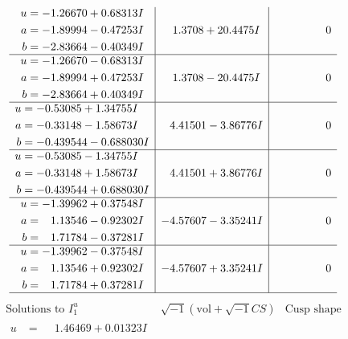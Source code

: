 \documentclass[1p]{elsarticle_modified}
\theoremstyle{definition}
\newcommand{\I}{\sqrt{-1}}
\begin{document}
$$\begin{array}{c|c|c}
\begin{aligned}
u &= -1.26670 + 0.68313 I \\
a &= -1.89994 - 0.47253 I \\
b &= -2.83664 - 0.40349 I\end{aligned}
 & \phantom{-}1.3708 + 20.4475 I & \phantom{-0.000000 } 0 \\ \hline\begin{aligned}
u &= -1.26670 - 0.68313 I \\
a &= -1.89994 + 0.47253 I \\
b &= -2.83664 + 0.40349 I\end{aligned}
 & \phantom{-}1.3708 - 20.4475 I & \phantom{-0.000000 } 0 \\ \hline\begin{aligned}
u &= -0.53085 + 1.34755 I \\
a &= -0.33148 - 1.58673 I \\
b &= -0.439544 - 0.688030 I\end{aligned}
 & \phantom{-}4.41501 - 3.86776 I & \phantom{-0.000000 } 0 \\ \hline\begin{aligned}
u &= -0.53085 - 1.34755 I \\
a &= -0.33148 + 1.58673 I \\
b &= -0.439544 + 0.688030 I\end{aligned}
 & \phantom{-}4.41501 + 3.86776 I & \phantom{-0.000000 } 0 \\ \hline\begin{aligned}
u &= -1.39962 + 0.37548 I \\
a &= \phantom{-}1.13546 - 0.92302 I \\
b &= \phantom{-}1.71784 - 0.37281 I\end{aligned}
 & -4.57607 - 3.35241 I & \phantom{-0.000000 } 0 \\ \hline\begin{aligned}
u &= -1.39962 - 0.37548 I \\
a &= \phantom{-}1.13546 + 0.92302 I \\
b &= \phantom{-}1.71784 + 0.37281 I\end{aligned}
 & -4.57607 + 3.35241 I & \phantom{-0.000000 } 0\\
 \hline 
 \end{array}$$\newpage$$\begin{array}{c|c|c}  
\text{Solutions to }I^u_{1}& \I (\text{vol} + \sqrt{-1}CS) & \text{Cusp shape}\\
 \hline 
\begin{aligned}
u &= \phantom{-}1.46469 + 0.01323 I \\

\end{aligned}
\end{array}$$
\end{document}
